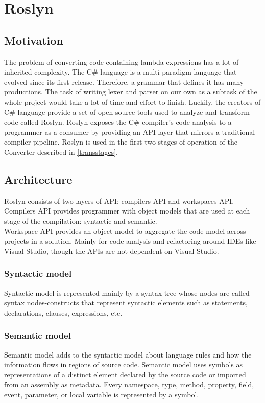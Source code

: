 \documentclass[]{report}
\begin{document}
    \section{Roslyn}
    \subsection{Motivation}
    The problem of converting code containing lambda expressions has a lot of inherited complexity. The C\# language is a multi-paradigm language that evolved since its first release. Therefore, a grammar that defines it has many productions. The task of writing lexer and parser on our own as a subtask of the whole project would take a lot of time and effort to finish. Luckily, the creators of C\# language provide a set of open-source tools used to analyze and transform code called Roslyn. Roslyn exposes the C\#  compiler’s code analysis to a programmer as a consumer by providing an API layer that mirrors a traditional compiler pipeline. \cite{roslynrepo} Roslyn is used in the first two stages of operation of the Converter described in \ref{transstages}.

    \subsection{Architecture}
   
    Roslyn consists of two layers of API: compilers API and workspaces API.\\
    Compilers API provides programmer with object models that are used at each stage of the compilation: syntactic and semantic.\\
    Workspace API provides an object model to aggregate the code model across projects in a solution. Mainly for code analysis and refactoring around IDEs like Visual Studio, though the APIs are not dependent on Visual Studio\cite{workspaceapi}. 
    
    \subsubsection{Syntactic model}
    Syntactic model is represented mainly by a syntax tree whose nodes are called syntax nodes-constructs that represent syntactic elements such as statements, declarations, clauses, expressions, etc.\\
    \subsubsection{Semantic model}
    Semantic model adds to the syntactic model about language rules and how the information flows in regions of source code. 
    Semantic model uses symbols as representations of a distinct element declared by the source code or imported from an assembly as metadata. Every namespace, type, method, property, field, event, parameter, or local variable is represented by a symbol\cite{roslynoverview}.
    
\end{document}
